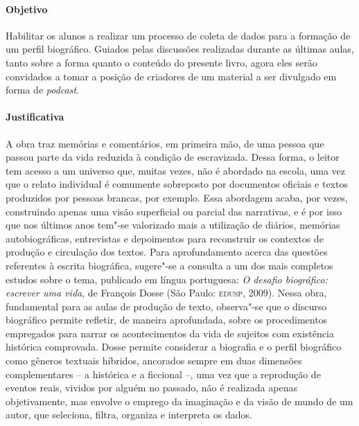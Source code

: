 \documentclass[11pt]{extarticle}
\begin{document}
 \paragraph{Objetivo} Habilitar os alunos a realizar um processo de coleta de dados
 para a formação de um perfil biográfico. Guiados pelas discussões realizadas durante as 
 últimas aulas, tanto sobre a forma quanto o conteúdo do presente livro, agora 
 eles serão convidados a tomar a posição de criadores de um material a ser divulgado
 em forma de \emph{podcast}.

 \paragraph{Justificativa} A obra traz memórias e comentários, em primeira mão, de uma
pessoa que passou parte da vida reduzida à condição de escravizada.
Dessa forma, o leitor tem acesso a um universo que, muitas vezes, não é
abordado na escola, uma vez que o relato individual é comumente
sobreposto por documentos oficiais e textos produzidos por pessoas
brancas, por exemplo. Essa abordagem acaba, por vezes, construindo
apenas uma visão superficial ou parcial das narrativas, e é por isso que
nos últimos anos tem"-se valorizado mais a utilização de diários,
memórias autobiográficas, entrevistas e depoimentos para reconstruir os
contextos de produção e circulação dos textos. 
Para aprofundamento acerca das questões
  referentes à escrita biográfica, sugere"-se a consulta a um dos mais
  completos estudos sobre o tema, publicado em língua portuguesa:
  \emph{O desafio biográfico: escrever uma vida}, de François Dosse (São
  Paulo: \textsc{edusp}, 2009). Nessa obra, fundamental para as aulas de produção
  de texto, observa"-se que o discurso biográfico permite refletir, de
  maneira aprofundada, sobre os procedimentos empregados para narrar os
  acontecimentos da vida de sujeitos com existência histórica
  comprovada. Dosse permite considerar a biografia e o perfil biográfico
  como gêneros textuais híbridos, ancorados sempre em duas dimensões
  complementares -- a histórica e a ficcional --, uma vez que a
  reprodução de eventos reais, vividos por alguém no passado, não é
  realizada apenas objetivamente, mas envolve o emprego da imaginação e
  da visão de mundo de um autor, que seleciona, filtra, organiza e
  interpreta os dados.
\end{document}
